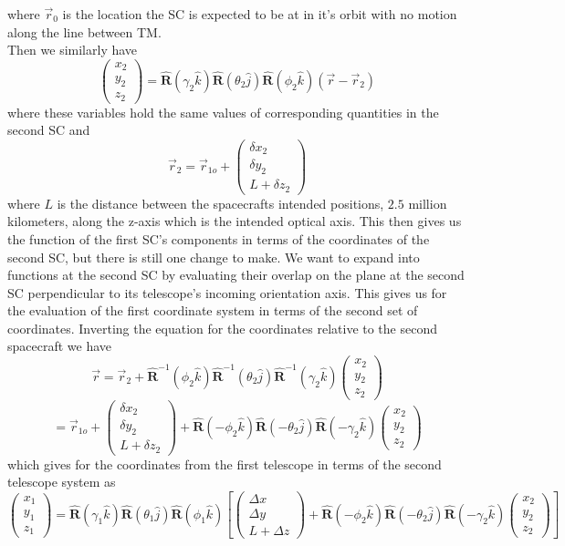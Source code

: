 \documentclass[11pt]{amsart}
\makeatletter
\newcommand{\op}[1]{\mathbf{\hat{#1}}}	%
\newcommand{\0}{\varnothing}		%
\newcommand{\1}{!}
\newcommand{\2}{@}
\newcommand{\3}{\#}
\newcommand{\4}{\$}
\newcommand{\5}{\%}
\newcommand{\6}{$^\wedge$}
\newcommand{\7}{\&}
\newcommand{\8}{*}
\newcommand{\9}{(}
\makeatother
\begin{document}
where $\vec{r}_0$ is the location the SC is expected to be at in it's orbit with no motion along the line between TM.\\
Then we similarly have
\[
\begin{pmatrix}x_2\\y_2\\z_2\end{pmatrix} = \op{R}(\gamma_2\hat{k})\op{R}(\theta_2\hat{j})\op{R}(\phi_2\hat{k})\left(\vec{r}-\vec{r}_2\right)
\]
where these variables hold the same values of corresponding quantities in the second SC and 
\[
\vec{r}_2 = \vec{r}_{1o} + \begin{pmatrix}\delta x_2\\ \delta y_2\\ L+\delta z_2
\end{pmatrix}
\]
where $L$ is the distance between the spacecrafts intended positions, $2.5$ million kilometers, along the z-axis which is the intended optical axis. This then gives us the function of the first SC's components in terms of the coordinates of the second SC, but there is still one change to make. We want to expand into functions at the second SC by evaluating their overlap on the plane at the second SC perpendicular to its telescope's incoming orientation axis. This gives  us for the evaluation of the first coordinate system in terms of the second set of coordinates. Inverting the equation for the coordinates relative to the second spacecraft we have
\[
\vec{r} = \vec{r}_2 + \op{R}^{-1}(\phi_2\hat{k})\op{R}^{-1}(\theta_2\hat{j})\op{R}^{-1}(\gamma_2\hat{k})\begin{pmatrix}
x_2
\\
y_2
\\
z_2
\end{pmatrix}
\]
\[
=\vec{r}_{1o}+\begin{pmatrix}\delta x_2\\ \delta y_2 \\ L+\delta z_2\end{pmatrix} + \op{R}(-\phi_2\hat{k})\op{R}(-\theta_2\hat{j})\op{R}(-\gamma_2\hat{k})\begin{pmatrix}
x_2
\\
y_2
\\
z_2
\end{pmatrix}
\]
which gives for the coordinates from the first telescope in terms of the second telescope system as
\[
\begin{pmatrix}
x_1\\y_1\\z_1
\end{pmatrix}
=\op{R}(\gamma_1\hat{k})\op{R}(\theta_1\hat{j})\op{R}(\phi_1\hat{k})\left[\begin{pmatrix}\Delta x\\\Delta y\\ L+\Delta z\end{pmatrix}
+\op{R}(-\phi_2\hat{k})\op{R}(-\theta_2\hat{j})\op{R}(-\gamma_2\hat{k})\begin{pmatrix}
x_2
\\
y_2
\\
z_2
\end{pmatrix}\right]
\]
\end{document}
